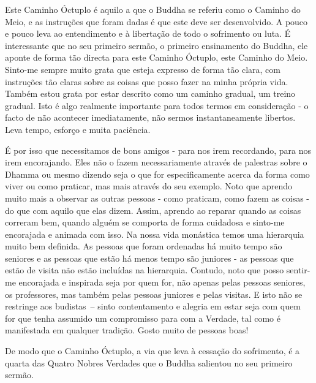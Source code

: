 Este Caminho Óctuplo é aquilo a que o Buddha se referiu como o Caminho
do Meio, e as instruções que foram dadas é que este deve ser
desenvolvido. A pouco e pouco leva ao entendimento e à libertação de
todo o sofrimento ou luta. É interessante que no seu primeiro sermão, o
primeiro ensinamento do Buddha, ele aponte de forma tão directa para
este Caminho Óctuplo, este Caminho do Meio. Sinto-me sempre muito grata
que esteja expresso de forma tão clara, com instruções tão claras sobre
as coisas que posso fazer na minha própria vida. Também estou grata por
estar descrito como um caminho gradual, um treino gradual. Isto é algo
realmente importante para todos termos em consideração - o facto de não
acontecer imediatamente, não sermos instantaneamente libertos. Leva
tempo, esforço e muita paciência.

É por isso que necessitamos de bons amigos - para nos irem recordando,
para nos irem encorajando. Eles não o fazem necessariamente através de
palestras sobre o Dhamma ou mesmo dizendo seja o que for especificamente
acerca da forma como viver ou como praticar, mas mais através do seu
exemplo. Noto que aprendo muito mais a observar as outras pessoas - como
praticam, como fazem as coisas - do que com aquilo que elas dizem.
Assim, aprendo ao reparar quando as coisas correram bem, quando alguém
se comporta de forma cuidadosa e \mbox{sinto-me} encorajada e animada com isso.
Na nossa vida monástica temos uma hierarquia muito bem definida. As
pessoas que foram ordenadas há muito tempo são seniores e as pessoas que
estão há menos tempo são juniores - as pessoas que estão de visita não
estão incluídas na hierarquia. Contudo, noto que posso sentir-me
encorajada e inspirada seja por quem for, não apenas pelas pessoas
seniores, os professores, mas também pelas pessoas juniores e pelas
visitas. E isto não se restringe aos budistas~-- sinto contentamento e
alegria em estar seja com quem for que tenha assumido um compromisso
para com a Verdade, tal como é manifestada em qualquer tradição. Gosto
muito de pessoas boas!

De modo que o Caminho Óctuplo, a via que leva à cessação do sofrimento,
é a quarta das Quatro Nobres Verdades que o Buddha salientou no seu
primeiro sermão.

